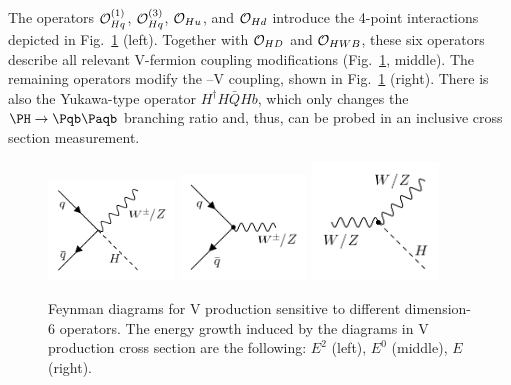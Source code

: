 \documentclass[a4paper,11pt]{article}
\newcommand{\Pb}{{{\Pqb}}\xspace}
\newcommand{\PAb}{{{{\Paqb}}}\xspace}
\renewcommand{\PV}{{{{V}}}\xspace}
\newcommand{\VH}{{{\PV}{\PH}}\xspace}
\begin{document}
The operators ${\cal O}^{(1)}_{Hq}$, ${\cal O}^{(3)}_{Hq}$, ${\cal O}_{Hu}$, and ${\cal O}_{Hd}$ introduce the 4-point interactions depicted in Fig.~\ref{fig:Feynman_digarams} (left). 
Together with ${\cal O}_{HD}$ and ${\cal O}_{HWB}$, these six operators describe all relevant \PV-fermion coupling modifications (Fig.~\ref{fig:Feynman_digarams}, middle). 
The remaining operators modify the \PH--\PV coupling, shown in Fig.~\ref{fig:Feynman_digarams} (right). 
There is also the Yukawa-type operator $H^\dagger H \bar{Q}H b$, which only changes the $\PH \to \Pb \PAb$ branching ratio and, thus, can be probed in an inclusive cross section measurement. 
\begin{figure}[hbtp]
\begin{center}
\includegraphics[width=0.3\textwidth]{Figures/Feynman_diagrams/ffVh.png}
\includegraphics[width=0.3\textwidth]{Figures/Feynman_diagrams/Vff.png}
\includegraphics[width=0.3\textwidth]{Figures/Feynman_diagrams/hVV.png}
\end{center}
\caption{
Feynman diagrams for \VH production sensitive to different dimension-6 operators.
The energy growth induced by the diagrams in \VH production cross section are the following: $E^2$ (left), $E^0$ (middle), $E$ (right). 
}
\label{fig:Feynman_digarams}
\end{figure}

\end{document}
